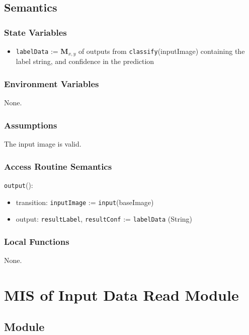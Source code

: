 \documentclass[12pt, titlepage]{article}
\def\code#1{\texttt{#1}}
\begin{document}
\subsection{Semantics}

\subsubsection{State Variables}

\begin{itemize}
\item \code{labelData} := $\mathbf{M}_{x,y}$ of outputs from \code{classify}(inputImage) containing the label string, and confidence in the prediction
\end{itemize}

\subsubsection{Environment Variables}

None.

\subsubsection{Assumptions}

The input image is valid.

\subsubsection{Access Routine Semantics}

\noindent \code{output}():
\begin{itemize}
\item transition: \code{inputImage} := \code{input}(baseImage)
\item output: \code{resultLabel}, \code{resultConf} := \code{labelData} (String)
\end{itemize}

\subsubsection{Local Functions}

None.

\section{MIS of Input Data Read Module} \label{ModuleIDR} 

\subsection{Module}
\end{document}
